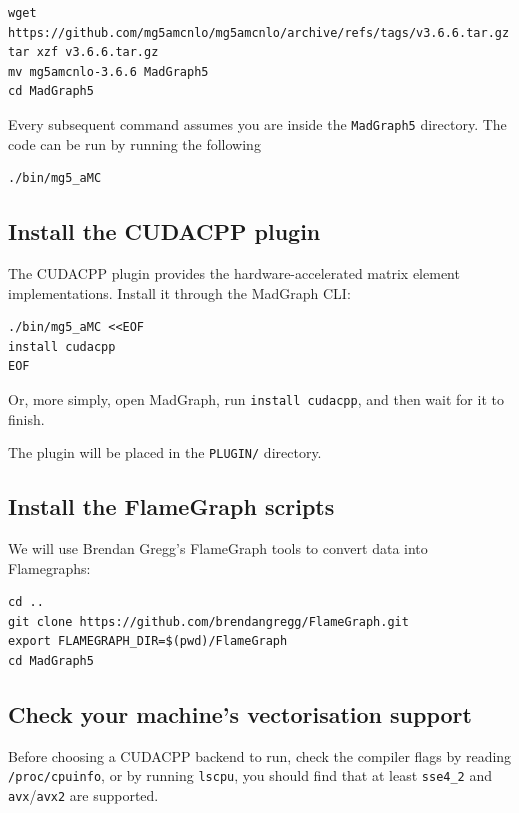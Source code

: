 \documentclass[11pt,a4paper]{article}
\begin{document}
\begin{lstlisting}[style=bashstyle]
wget https://github.com/mg5amcnlo/mg5amcnlo/archive/refs/tags/v3.6.6.tar.gz
tar xzf v3.6.6.tar.gz
mv mg5amcnlo-3.6.6 MadGraph5
cd MadGraph5
\end{lstlisting}

Every subsequent command assumes you are inside the \texttt{MadGraph5} directory.
The code can be run by running the following

\begin{lstlisting}[style=bashstyle]
./bin/mg5_aMC
\end{lstlisting}


\subsection{Install the CUDACPP plugin}

The CUDACPP plugin provides the hardware-accelerated matrix element implementations.
Install it through the MadGraph CLI:

\begin{lstlisting}[style=bashstyle]
./bin/mg5_aMC <<EOF
install cudacpp
EOF
\end{lstlisting}

Or, more simply, open MadGraph, run \texttt{install cudacpp}, and then wait for it to finish.

The plugin will be placed in the \texttt{PLUGIN/} directory.

\subsection{Install the FlameGraph scripts}
\label{sec:installation_flamegraph}

We will use Brendan Gregg's FlameGraph tools to convert \perf data into Flamegraphs:

\begin{lstlisting}[style=bashstyle]
cd ..
git clone https://github.com/brendangregg/FlameGraph.git
export FLAMEGRAPH_DIR=$(pwd)/FlameGraph
cd MadGraph5
\end{lstlisting}

\subsection{Check your machine's vectorisation support}
\label{sec:check_simd}

Before choosing a CUDACPP backend to run, check the compiler flags by reading \texttt{/proc/cpuinfo}, or by running \texttt{lscpu}, you should find that at least \texttt{sse4\_2} and \texttt{avx}/\texttt{avx2} are supported.
\end{document}
